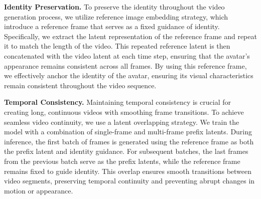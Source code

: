 \begin{algorithm}
\caption{Long Video Inference}
\label{algo:infer}
\end{algorithm}

\noindent\textbf{Identity Preservation.}
To preserve the identity throughout the video generation process, we utilize reference image embedding strategy, which introduce a reference frame that serves as a fixed guidance of identity. Specifically, we extract the latent representation of the reference frame and repeat it to match the length of the video. This repeated reference latent is then concatenated with the video latent at each time step, ensuring that the avatar's appearance remains consistent across all frames. By using this reference frame, we effectively anchor the identity of the avatar, ensuring its visual characteristics remain consistent throughout the video sequence.

\noindent\textbf{Temporal Consistency.}
Maintaining temporal consistency is crucial for creating long, continuous videos with smoothing frame transitions. To achieve seamless video continuity, we use a latent overlapping strategy. We train the model with a combination of single-frame and multi-frame prefix latents. During inference, the first batch of frames is generated using the reference frame as both the prefix latent and identity guidance. For subsequent batches, the last frames from the previous batch serve as the prefix latents, while the reference frame remains fixed to guide identity. This overlap ensures smooth transitions between video segments, preserving temporal continuity and preventing abrupt changes in motion or appearance.


